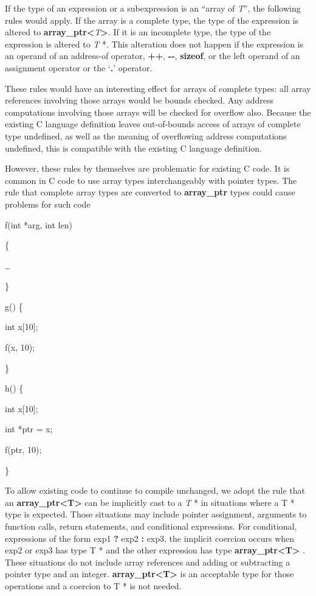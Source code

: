 \documentclass[]{article}
\begin{document}
If the type of an expression or a subexpression is an ``array of
\emph{T}'', the following rules would apply. If the array is a complete
type, the type of the expression is altered to
\textbf{array\_ptr\textless{}}\emph{T}\textbf{\textgreater{}}. If it is
an incomplete type, the type of the expression is altered to \emph{T} *.
This alteration does not happen if the expression is an operand of an
address-of operator, \textbf{++}, \textbf{-\/-}, \textbf{sizeof}, or the
left operand of an assignment operator or the `\textbf{.}' operator.

These rules would have an interesting effect for arrays of complete
types: all array references involving those arrays would be bounds
checked. Any address computations involving those arrays will be checked
for overflow also. Because the existing C language definition leaves
out-of-bounds access of arrays of complete type undefined, as well as
the meaning of overflowing address computations undefined, this is
compatible with the existing C language definition.

However, these rules by themselves are problematic for existing C code.
It is common in C code to use array types interchangeably with pointer
types. The rule that complete array types are converted to
\textbf{array\_ptr} types could cause problems for such code

f(int *arg, int len)

\{

\ldots{}

\}

g() \{

int x{[}10{]};

f(x, 10);

\}

h() \{

int x{[}10{]};

int *ptr = x;

f(ptr, 10);

\}

To allow existing code to continue to compile unchanged, we adopt the
rule that an \textbf{array\_ptr\textless{}T\textgreater{}} can be
implicitly cast to a \emph{T} * in situations where a T * type is
expected. Those situations may include pointer assignment, arguments to
function calls, return statements, and conditional expressions. For
conditional, expressions of the form exp1 \textbf{?} exp2 \textbf{:}
exp3, the implicit coercion occurs when exp2 or exp3 has type T * and
the other expression has type
\textbf{array\_ptr\textless{}T\textgreater{}} . These situations do not
include array references and adding or subtracting a pointer type and an
integer. \textbf{array\_ptr\textless{}T\textgreater{}} is an acceptable
type for those operations and a coercion to T * is not needed.
\end{document}
